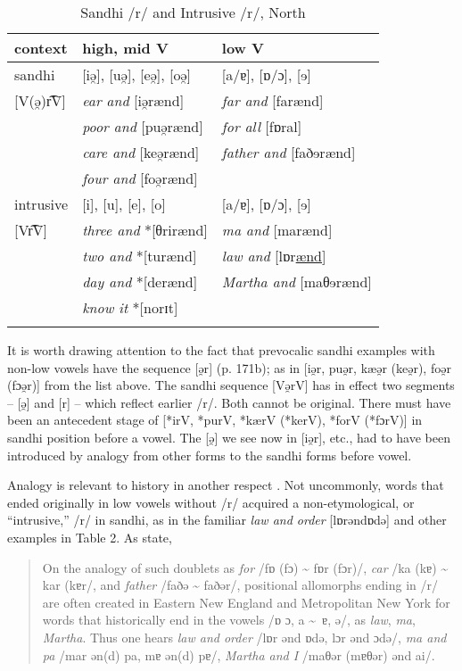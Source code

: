 \documentclass[output=paper,
modfonts
]{LSP/langsci}
\begin{document}
\begin{table}[ht]
\centering\caption{Sandhi /r/ and Intrusive /r/, North}
\begin{tabular}{lll}
\lsptoprule
context 		  & 		high, mid V 		& low V\\
\midrule
sandhi 	  	  &  {[}iə̯{]}, {[}uə̯{]}, {[}eə̯{]}, {[}oə̯{]}	&	[a/ɐ], [ɒ/ɔ], [ɘ]\\
{[}V(ə̯)r͡V{]} & \emph{ear and} {[}iə̯rænd{]}		&	\emph{far and} {[}farænd{]}\\
			  & \emph{poor and} {[}puə̯rænd{]}		&	\emph{for all} {[}fɒral{]} \\
			  & \emph{care and} {[}keə̯rænd{]}		&	\emph{father and} {[}faðɘrænd{]}\\
			  & \emph{four and} {[}foə̯rænd{]}	 	& 	\\
intrusive		  & {[}i{]}, {[}u{]}, {[}e{]}, {[}o{]}			&	[a/ɐ], [ɒ/ɔ], [ɘ] \\
{[}Vr͡V{]}	  & \emph{three and} *{[}θrirænd{]}		&	\emph{ma and} {[}marænd{]} \\
			  & \emph{two and} *{[}turænd{]}		&	\emph{law and} [lɒr\underline{ænd}] \\
			  & \emph{day and} *{[}derænd{]}		&	\emph{Martha and} {[}maθɘrænd{]} \\
			  & \emph{know it} *{[}norɪt{]}			&	\\
\lspbottomrule
\end{tabular}
\end{table}

It is worth drawing attention to the fact that prevocalic sandhi
examples with non-low vowels have the sequence {[}ə̯r{]} (p. 171b); as in
{[}iə̯r, puə̯r, kæə̯r (keə̯r), foə̯r (fɔə̯r){]} from the list above. The
sandhi sequence {[}Və̯rV{]} has in effect two segments -- {[}ə̯{]} and
{[}r{]} -- which reflect earlier /r/. Both cannot be original. There must
have been an antecedent stage of {[}*irV, *purV, *kærV (*kerV), *forV
(*fɔrV){]} in sandhi position before a vowel. The {[}ə̯{]} we see now in
{[}iə̯r{]}, etc., had to have been introduced by analogy from other forms
to the sandhi forms before vowel.

Analogy is relevant to history in another respect \citep{SOS}. Not
uncommonly, words that ended originally in low vowels without /r/
acquired a non-etymological, or ``intrusive,'' /r/ in sandhi, as in the
familiar \emph{law and order} {[}lɒrəndɒdə{]} and other examples in
Table 2. As \citet[172a]{KUR} state,

\begin{quote}
On the analogy of such doublets as \emph{for} /fɒ (fɔ) \textasciitilde{}
fɒr (fɔr)/, \emph{car} /ka (kɐ) \textasciitilde{} kar (kɐr/, and
\emph{father} /faðə \textasciitilde{} faðər/, positional allomorphs
ending in /r/ are often created in Eastern New England and Metropolitan
New York for words that historically end in the vowels /ɒ  ɔ, a \textasciitilde\ ɐ, ə/, as \emph{law},
\emph{ma}, \emph{Martha}. Thus one hears \emph{law and order} /lɒr ənd
ɒdə, lɔr ənd ɔdə/, \emph{ma and pa} /mar ən(d) pa, mɐ ən(d) pɐ/,
\emph{Martha and I} /maθər (mɐθər) ənd ai/.
\end{quote}
\end{document}
